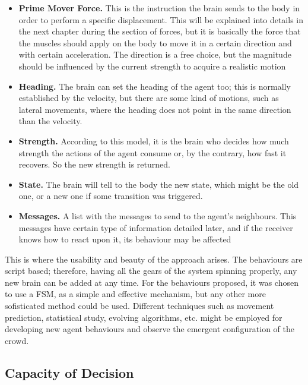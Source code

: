 \begin{itemize}

\item{{\bf Prime Mover Force.} This is the instruction the brain sends to the body in order to perform a specific displacement. This will be explained into details in the next chapter during the section of forces, but it is basically the force that the muscles should apply on the body to move it in a certain direction and with certain acceleration. The direction is a free choice, but the magnitude should be influenced by the current strength to acquire a realistic motion}

\item{{\bf Heading.} The brain can set the heading of the agent too; this is normally established by the velocity, but there are some kind of motions, such as lateral movements, where the heading does not point in the same direction than the velocity.}

\item{{\bf Strength.} According to this model, it is the brain who decides how much strength the actions of the agent consume or, by the contrary, how fast it recovers. So the new strength is returned.}

\item{{\bf State.} The brain will tell to the body the new state, which might be the old one, or a new one if some transition was triggered.}

\item{{\bf Messages.} A list with the messages to send to the agent's neighbours. This messages have certain type of information detailed later, and if the receiver knows how to react upon it, its behaviour may be affected}

\end{itemize}

This is where the usability and beauty of the approach arises. The behaviours are script based; therefore, having all the gears of the system spinning properly, any new brain can be added at any time. For the behaviours proposed, it was chosen to use a FSM, as a simple and effective mechanism, but any other more sofisticated method could be used. Different techniques such as movement prediction, statistical study, evolving algorithms, etc. might be employed for developing new agent behaviours and observe the emergent configuration of the crowd.

\subsection{Capacity of Decision}

